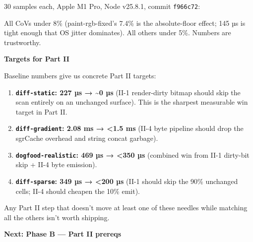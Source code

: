 30 samples each, Apple M1 Pro, Node v25.8.1, commit \texttt{f\allowbreak{}9\allowbreak{}6\allowbreak{}6\allowbreak{}c\allowbreak{}7\allowbreak{}2}:



All CoVs under 8\% (paint-rgb-fixed's 7.4\% is the absolute-floor effect; 145 µs is tight enough that OS jitter dominates). All others under 5\%. Numbers are trustworthy.

\textbf{Targets for Part II}

Baseline numbers give us concrete Part II targets:

\begin{enumerate}
\def\labelenumi{\arabic{enumi}.}
\tightlist
\item
  \textbf{\texttt{d\allowbreak{}i\allowbreak{}f\allowbreak{}f\allowbreak{}-\allowbreak{}s\allowbreak{}t\allowbreak{}a\allowbreak{}t\allowbreak{}i\allowbreak{}c}: 227 µs → \textasciitilde0 µs} (II-1 render-dirty bitmap should skip the scan entirely on an unchanged surface). This is the sharpest measurable win target in Part II.
\item
  \textbf{\texttt{d\allowbreak{}i\allowbreak{}f\allowbreak{}f\allowbreak{}-\allowbreak{}g\allowbreak{}r\allowbreak{}a\allowbreak{}d\allowbreak{}i\allowbreak{}e\allowbreak{}n\allowbreak{}t}: 2.08 ms → \textless1.5 ms} (II-4 byte pipeline should drop the sgrCache overhead and string concat garbage).
\item
  \textbf{\texttt{d\allowbreak{}o\allowbreak{}g\allowbreak{}f\allowbreak{}o\allowbreak{}o\allowbreak{}d\allowbreak{}-\allowbreak{}r\allowbreak{}e\allowbreak{}a\allowbreak{}l\allowbreak{}i\allowbreak{}s\allowbreak{}t\allowbreak{}i\allowbreak{}c}: 469 µs → \textless350 µs} (combined win from II-1 dirty-bit skip + II-4 byte emission).
\item
  \textbf{\texttt{d\allowbreak{}i\allowbreak{}f\allowbreak{}f\allowbreak{}-\allowbreak{}s\allowbreak{}p\allowbreak{}a\allowbreak{}r\allowbreak{}s\allowbreak{}e}: 349 µs → \textless200 µs} (II-1 should skip the 90\% unchanged cells; II-4 should cheapen the 10\% emit).
\end{enumerate}

Any Part II step that doesn't move at least one of these needles while matching all the others isn't worth shipping.

\textbf{Next: Phase B --- Part II prereqs}

